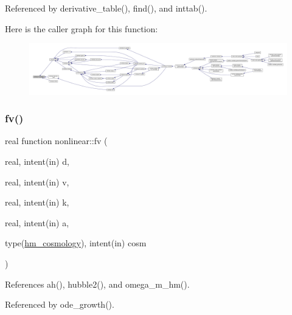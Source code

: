 Referenced by derivative\+\_\+table(), find(), and inttab().

Here is the caller graph for this function\+:
\nopagebreak
\begin{figure}[H]
\begin{center}
\leavevmode
\includegraphics[width=350pt]{namespacenonlinear_ade72d40a60522b6b609687fbe7e9ddbb_icgraph}
\end{center}
\end{figure}
\mbox{\label{namespacenonlinear_aa6814235c0bd98fe3c05073b03b16fac}} 
\subsubsection{\texorpdfstring{fv()}{fv()}}
{\footnotesize\ttfamily real function nonlinear\+::fv (\begin{DoxyParamCaption}\item[{real, intent(in)}]{d,  }\item[{real, intent(in)}]{v,  }\item[{real, intent(in)}]{k,  }\item[{real, intent(in)}]{a,  }\item[{type(\mbox{\hyperlink{structnonlinear_1_1hm__cosmology}{hm\+\_\+cosmology}}), intent(in)}]{cosm }\end{DoxyParamCaption})\hspace{0.3cm}{\ttfamily [private]}}



References ah(), hubble2(), and omega\+\_\+m\+\_\+hm().



Referenced by ode\+\_\+growth().

